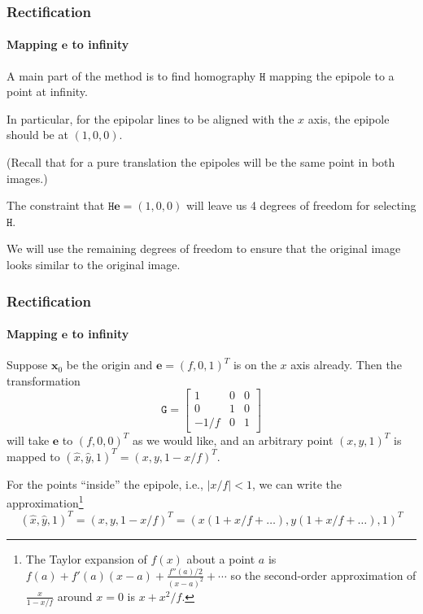 \documentclass[aspectratio=169]{beamer}
\renewcommand{\vec}[1]{\boldsymbol{#1}}
\newcommand{\mat}[1]{\mathtt{#1}}
\begin{document}
\begin{frame}
\frametitle{Rectification}
\framesubtitle{Mapping $\vec{e}$ to infinity}

A main part of the method is to find homography $\mat{H}$
\alert{mapping the epipole to a point at infinity}.

\medskip

In particular, for the epipolar lines to be aligned with the $x$ axis,
the epipole should be at $(1,0,0)$.

\medskip

(Recall that for a pure translation the epipoles will be the same
point in both images.)

\medskip

The constraint that $\mat{H}\vec{e}=(1,0,0)$ will leave us 4 degrees
of freedom for selecting $\mat{H}$.

\medskip

We will use the remaining degrees of freedom to ensure that the
original image \alert{looks similar} to the original image.

\end{frame}

\begin{frame}
\frametitle{Rectification}
\framesubtitle{Mapping $\vec{e}$ to infinity}

Suppose $\vec{x}_0$ be the origin and $\vec{e}=(f,0,1)^T$ is on the
$x$ axis already.  Then the transformation
\begin{equation*}
\mat{G}=\begin{bmatrix} 1 & 0 & 0 \\ 0 & 1 & 0 \\ -1/f & 0 & 1
\end{bmatrix}
\end{equation*}
will take $\vec{e}$ to $(f,0,0)^T$ as we would like, and an arbitrary
point $(x,y,1)^T$ is mapped to $(\hat{x},\hat{y},1)^T=(x,y,1-x/f)^T$.

\medskip

For the points ``inside'' the epipole, i.e., $|x/f|<1$, we can write
the approximation\footnote{The Taylor expansion of $f(x)$ about a
  point $a$ is $f(a)+f'(a)(x-a)+\frac{f''(a)/2}{(x-a)^2}+\cdots$ so
  the second-order approximation of $\frac{x}{1-x/f}$ around $x=0$ is
  $x+x^2/f$.}
\begin{equation}
(\hat{x},\hat{y},1)^T=(x,y,1-x/f)^T=(x(1+x/f+\ldots),y(1+x/f+\ldots),1)^T
\end{equation}

\end{frame}
\end{document}
